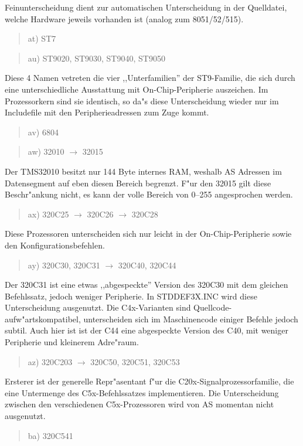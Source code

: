 \documentclass[12pt,a4paper,twoside]{report}
\begin{document}
{Feinunterscheidung dient zur automatischen Unterscheidung in der Quelldatei,
welche Hardware jeweils vorhanden ist (analog zum 8051/52/515).
\begin{quote}
at) ST7
\end{quote}
\begin{quote}
au) ST9020, ST9030, ST9040, ST9050
\end{quote}
Diese 4 Namen vetreten die vier ,,Unterfamilien'' der ST9-Familie, die
sich durch eine unterschiedliche Ausstattung mit On-Chip-Peripherie
auszeichen.  Im Prozessorkern sind sie identisch, so da"s diese
Unterscheidung wieder nur im Includefile mit den Peripherieadressen zum
Zuge kommt.
\begin{quote}
av) 6804
\end{quote}
\begin{quote}
aw) 32010 $\rightarrow$ 32015
\end{quote}
Der TMS32010 besitzt nur 144 Byte internes RAM, weshalb AS Adressen im
Datensegment auf eben diesen Bereich begrenzt.  F"ur den 32015 gilt diese
Beschr"ankung nicht, es kann der volle Bereich von 0--255 angesprochen
werden.
\begin{quote}
ax) 320C25 $\rightarrow$ 320C26 $\rightarrow$ 320C28
\end{quote}
Diese Prozessoren unterscheiden sich nur leicht in der
On-Chip-Peripherie sowie den Konfigurationsbefehlen.
\begin{quote}
ay) 320C30, 320C31 $\rightarrow$ 320C40, 320C44
\end{quote}
Der 320C31 ist eine etwas ,,abgespeckte'' Version des 320C30 mit dem
gleichen Befehlssatz, jedoch weniger Peripherie.  In STDDEF3X.INC
wird diese Unterscheidung ausgenutzt.  Die C4x-Varianten sind
Quellcode-aufw"artskompatibel, unterscheiden sich im
Maschinencode einiger Befehle jedoch subtil.  Auch hier ist ist
der C44 eine abgespeckte Version des C40, mit weniger Peripherie
und kleinerem Adre"raum.
\begin{quote}
az) 320C203 $\rightarrow$ 320C50, 320C51, 320C53
\end{quote}
Ersterer ist der generelle Repr"asentant f"ur die
C20x-Signalprozessorfamilie, die eine Untermenge des C5x-Befehlssatzes
implementieren.  Die Unterscheidung zwischen den verschiedenen
C5x-Prozessoren wird von AS momentan nicht ausgenutzt.
\begin{quote}
ba) 320C541
\end{quote}  
}
\end{document}
